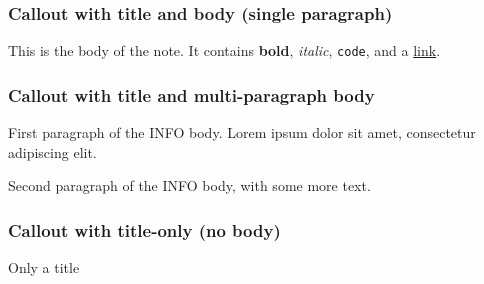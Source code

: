 \subsubsection{Callout with title and body (single
paragraph)}\label{inner-1-callout-with-title-and-body-single-paragraph}

\begin{tcolorbox}[breakable,colback=ocGryBack,colframe=ocGryFrame,coltitle=ocGryTitle,left=3mm,boxed title style={left=1mm},title={\hspace*{-2.5mm}\iconNote\; A simple NOTE callout}]

This is the body of the note. It contains \textbf{bold}, \emph{italic},
\texttt{code}, and a \href{https://example.com}{link}.

\end{tcolorbox}

\subsubsection{Callout with title and multi-paragraph
body}\label{inner-1-callout-with-title-and-multi-paragraph-body}

\begin{tcolorbox}[breakable,colback=ocGryBack,colframe=ocGryFrame,coltitle=ocGryTitle,left=3mm,boxed title style={left=1mm},title={\hspace*{-2.5mm}\iconInfo\; Info with multi-paragraph body}]

First paragraph of the INFO body. Lorem ipsum dolor sit amet,
consectetur adipiscing elit.

Second paragraph of the INFO body, with some more text.

\end{tcolorbox}

\subsubsection{Callout with title-only (no
body)}\label{inner-1-callout-with-title-only-no-body}

\vspace{2mm}

\noindent\begin{tcolorbox}[colback=ocYelBack,colframe=ocYelFrame,coltitle=ocYelTitle,left=3mm,width=\linewidth,boxrule=0pt]

\hspace*{-2.5mm}\iconHint\; Only a title

\end{tcolorbox}

